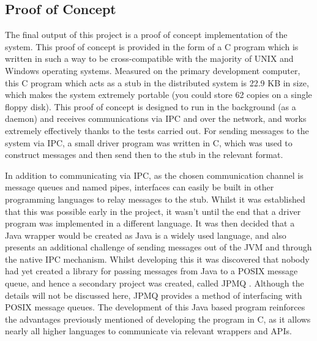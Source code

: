 \documentclass[a4paper, 11pt]{report}
\begin{document}
\subsection{Proof of Concept}
The final output of this project is a proof of concept implementation of the system. This proof of concept is provided in the form of a C program which is written in such a way to be cross-compatible with the majority of UNIX and Windows operating systems. Measured on the primary development computer, this C program which acts as a \gls{stub} in the distributed system is 22.9 KB in size, which makes the system extremely portable (you could store 62 copies on a single floppy disk). This proof of concept is designed to run in the background (as a daemon) and receives communications via \acrshort{IPC} and over the network, and works extremely effectively thanks to the tests carried out. For sending messages to the system via \acrshort{IPC}, a small driver program was written in C, which was used to construct messages and then send then to the \gls{stub} in the relevant format.

In addition to communicating via \acrshort{IPC}, as the chosen communication channel is message queues and named pipes, interfaces can easily be built in other programming languages to relay messages to the \gls{stub}. Whilst it was established that this was possible early in the project, it wasn't until the end that a driver program was implemented in a different language. It was then decided that a Java wrapper would be created as Java is a widely used language, and also presents an additional challenge of sending messages out of the JVM and through the native \acrshort{IPC} mechanism. Whilst developing this it was discovered that nobody had yet created a library for passing messages from Java to a POSIX message queue, and hence a secondary project was created, called JPMQ \cite{jpmq}. Although the details will not be discussed here, JPMQ provides a method of interfacing with \acrshort{POSIX} message queues. The development of this Java based program reinforces the advantages previously mentioned of developing the program in C, as it allows nearly all higher languages to communicate via relevant wrappers and \acrshort{API}s.
\end{document}
